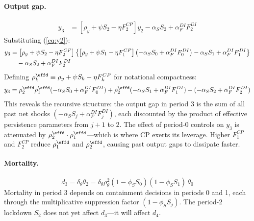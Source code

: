 \documentclass[12pt, a4paper]{article}
\begin{document}
\paragraph{Output gap.}
%
\begin{align}
    y_3 &= \left[\rho_y + \psi S_2 - \eta F_2^{CP}\right] y_2
      - \alpha_S S_2 + \alpha_F^{DI} F_2^{DI}
    \label{eq:y3}
\end{align}
%
Substituting (\ref{eq:y2}):
%
\begin{align}
    y_3 &= \left[\rho_y + \psi S_2 - \eta F_2^{CP}\right]
    \left\{
      \left[\rho_y + \psi S_1 - \eta F_1^{CP}\right]
      \left(-\alpha_S S_0 + \alpha_F^{DI} F_0^{DI}\right)
      - \alpha_S S_1 + \alpha_F^{DI} F_1^{DI}
    \right\}
    \notag \\
    &\quad - \alpha_S S_2 + \alpha_F^{DI} F_2^{DI}
    \label{eq:y3_full}
\end{align}
%
Defining $\rho_k^{\effd} \equiv \rho_y + \psi S_k - \eta F_k^{CP}$ for notational compactness:
%
\begin{equation}
    y_3 = \rho_2^{\effd} \rho_1^{\effd} (-\alpha_S S_0 + \alpha_F^{DI} F_0^{DI})
      + \rho_2^{\effd} (-\alpha_S S_1 + \alpha_F^{DI} F_1^{DI})
      + (-\alpha_S S_2 + \alpha_F^{DI} F_2^{DI})
    \label{eq:y3_compact}
\end{equation}
%
This reveals the recursive structure: the output gap in period 3 is the sum of all past net shocks $(-\alpha_S S_j + \alpha_F^{DI} F_j^{DI})$, each discounted by the product of effective persistence parameters from $j+1$ to 2. The effect of period-0 controls on $y_3$ is attenuated by $\rho_2^{\effd} \cdot \rho_1^{\effd}$---which is where CP exerts its leverage. Higher $F_1^{CP}$ and $F_2^{CP}$ reduce $\rho_1^{\effd}$ and $\rho_2^{\effd}$, causing past output gaps to dissipate faster.

\paragraph{Mortality.}
%
\begin{equation}
    d_3 = \delta_\theta \theta_2
      = \delta_\theta \rho_\theta^2 (1 - \phi_S S_0)(1 - \phi_S S_1) \, \theta_0
    \label{eq:d3}
\end{equation}
%
Mortality in period 3 depends on containment decisions in periods 0 and 1, each through the multiplicative suppression factor $(1 - \phi_S S_j)$. The period-2 lockdown $S_2$ does not yet affect $d_3$---it will affect $d_4$.
\end{document}
